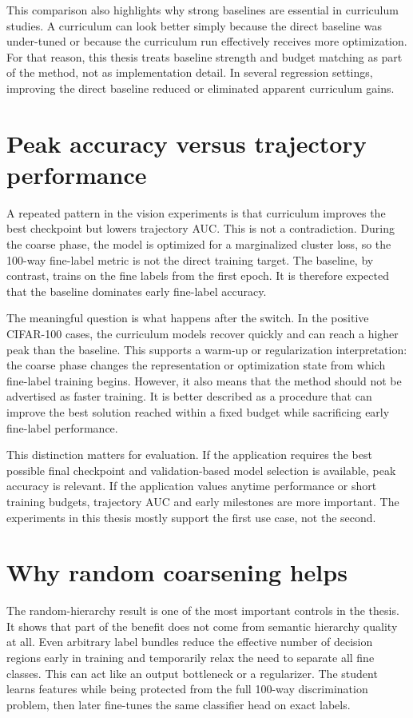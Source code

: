 \documentclass[english,master,a4paper,oneside]{ppfcmthesis}
\begin{document}
This comparison also highlights why strong baselines are essential in curriculum
studies. A curriculum can look better simply because the direct baseline was
under-tuned or because the curriculum run effectively receives more
optimization. For that reason, this thesis treats baseline strength and budget
matching as part of the method, not as implementation detail. In several
regression settings, improving the direct baseline reduced or eliminated
apparent curriculum gains.

\section{Peak accuracy versus trajectory performance}

A repeated pattern in the vision experiments is that curriculum improves the
best checkpoint but lowers trajectory AUC. This is not a contradiction. During
the coarse phase, the model is optimized for a marginalized cluster loss, so the
100-way fine-label metric is not the direct training target. The baseline, by
contrast, trains on the fine labels from the first epoch. It is therefore
expected that the baseline dominates early fine-label accuracy.

The meaningful question is what happens after the switch. In the positive
CIFAR-100 cases, the curriculum models recover quickly and can reach a higher
peak than the baseline. This supports a warm-up or regularization
interpretation: the coarse phase changes the representation or optimization
state from which fine-label training begins. However, it also means that the
method should not be advertised as faster training. It is better described as a
procedure that can improve the best solution reached within a fixed budget while
sacrificing early fine-label performance.

This distinction matters for evaluation. If the application requires the best
possible final checkpoint and validation-based model selection is available,
peak accuracy is relevant. If the application values anytime performance or
short training budgets, trajectory AUC and early milestones are more important.
The experiments in this thesis mostly support the first use case, not the
second.

\section{Why random coarsening helps}

The random-hierarchy result is one of the most important controls in the thesis.
It shows that part of the benefit does not come from semantic hierarchy quality
at all. Even arbitrary label bundles reduce the effective number of decision
regions early in training and temporarily relax the need to separate all fine
classes. This can act like an output bottleneck or a regularizer. The student
learns features while being protected from the full 100-way discrimination
problem, then later fine-tunes the same classifier head on exact labels.
\end{document}
